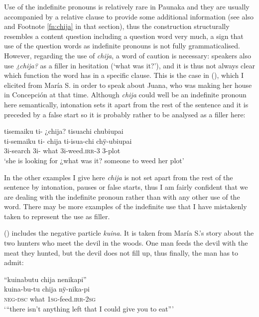 Use of the indefinite pronouns is relatively rare in Paunaka and they are usually accompanied by a relative clause to provide some additional information (see also  and Footnote \ref{fn:chija} in that section), thus the construction structurally resembles a content question including a question word very much, a sign that use of the question words as indefinite pronouns is not fully grammaticalised. However, regarding the use of \textit{chija}, a word of caution is necessary: speakers also use \textit{¿chija?} as a filler in hesitation (‘what was it?’), and it is thus not always clear which function the word has in a specific clause. This is the case in (), which I elicited from María S. in order to speak about Juana, who was making her house in Concepción at that time. Although \textit{chija} could well be an indefinite pronoun here semantically, intonation sets it apart from the rest of the sentence and it is preceded by a false start so it is probably rather to be analysed as a filler here:

\newpage
\ea\label{ex:chija-INDEF1}
\begingl
\glpreamble tisemaiku ti- ¿chija? tisuachi chubiupai\\
\gla ti-semaiku ti- chija ti-isua-chi chÿ-ubiupai\\
\glb 3i-search 3i- what 3i-weed.\textsc{irr}-3 3-plot\\
\glft ‘she is looking for ¿what was it? someone to weed her plot’
\endgl
\trailingcitation{[rxx-e120511l.047]}
\xe

In the other examples I give here \textit{chija} is not set apart from the rest of the sentence by intonation, pauses or false starts, thus I am fairly confident that we are dealing with the indefinite pronoun rather than with any other use of the word. There may be more examples of the indefinite use that I have mistakenly taken to represent the use as filler.

() includes the negative particle \textit{kuina}. It is taken from María S.’s story about the two hunters who meet the devil in the woods. One man feeds the devil with the meat they hunted, but the devil does not fill up, thus finally, the man has to admit:

\ea\label{ex:chija-INDEF3}
\begingl
\glpreamble “kuinabutu chija nenikapi”\\
\gla kuina-bu-tu chija nÿ-nika-pi\\
\glb \textsc{neg}-\textsc{dsc} what 1\textsc{sg}-feed.\textsc{irr}-2\textsc{sg}\\
\glft ‘“there isn’t anything left that I could give you to eat”’
\endgl
\trailingcitation{[rxx-n120511l-2.45-46]}
\xe


